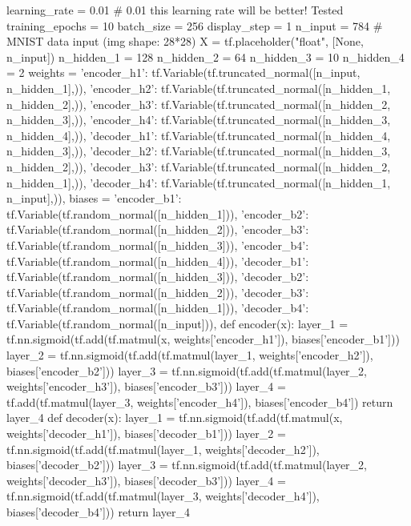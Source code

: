 \begin{python}
learning_rate = 0.01    # 0.01 this learning rate will be better! Tested
training_epochs = 10
batch_size = 256
display_step = 1
n_input = 784  # MNIST data input (img shape: 28*28)
X = tf.placeholder("float", [None, n_input])
n_hidden_1 = 128
n_hidden_2 = 64
n_hidden_3 = 10
n_hidden_4 = 2
weights = {
    'encoder_h1': tf.Variable(tf.truncated_normal([n_input, n_hidden_1],)),
    'encoder_h2': tf.Variable(tf.truncated_normal([n_hidden_1, n_hidden_2],)),
    'encoder_h3': tf.Variable(tf.truncated_normal([n_hidden_2, n_hidden_3],)),
    'encoder_h4': tf.Variable(tf.truncated_normal([n_hidden_3, n_hidden_4],)),
    'decoder_h1': tf.Variable(tf.truncated_normal([n_hidden_4, n_hidden_3],)),
    'decoder_h2': tf.Variable(tf.truncated_normal([n_hidden_3, n_hidden_2],)),
    'decoder_h3': tf.Variable(tf.truncated_normal([n_hidden_2, n_hidden_1],)),
    'decoder_h4': tf.Variable(tf.truncated_normal([n_hidden_1, n_input],)),
}
biases = {
    'encoder_b1': tf.Variable(tf.random_normal([n_hidden_1])),
    'encoder_b2': tf.Variable(tf.random_normal([n_hidden_2])),
    'encoder_b3': tf.Variable(tf.random_normal([n_hidden_3])),
    'encoder_b4': tf.Variable(tf.random_normal([n_hidden_4])),
    'decoder_b1': tf.Variable(tf.random_normal([n_hidden_3])),
    'decoder_b2': tf.Variable(tf.random_normal([n_hidden_2])),
    'decoder_b3': tf.Variable(tf.random_normal([n_hidden_1])),
    'decoder_b4': tf.Variable(tf.random_normal([n_input])),
}
def encoder(x):
    layer_1 = tf.nn.sigmoid(tf.add(tf.matmul(x, weights['encoder_h1']),
                                   biases['encoder_b1']))
    layer_2 = tf.nn.sigmoid(tf.add(tf.matmul(layer_1, weights['encoder_h2']),
                                   biases['encoder_b2']))
    layer_3 = tf.nn.sigmoid(tf.add(tf.matmul(layer_2, weights['encoder_h3']),
                                   biases['encoder_b3']))
    layer_4 = tf.add(tf.matmul(layer_3, weights['encoder_h4']),
                                    biases['encoder_b4'])
    return layer_4
def decoder(x):
    layer_1 = tf.nn.sigmoid(tf.add(tf.matmul(x, weights['decoder_h1']),
                                   biases['decoder_b1']))
    layer_2 = tf.nn.sigmoid(tf.add(tf.matmul(layer_1, weights['decoder_h2']),
                                   biases['decoder_b2']))
    layer_3 = tf.nn.sigmoid(tf.add(tf.matmul(layer_2, weights['decoder_h3']),
                                biases['decoder_b3']))
    layer_4 = tf.nn.sigmoid(tf.add(tf.matmul(layer_3, weights['decoder_h4']),
                                biases['decoder_b4']))
    return layer_4


\end{python}
